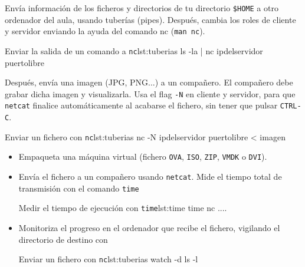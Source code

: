 \begin{homeworkProblem}
  Envía información de los ficheros y directorios de tu directorio \texttt{\$HOME} a otro ordenador del aula, usando tuberías (pipes). Después, cambia los roles de cliente y servidor enviando la ayuda del comando nc (\texttt{man nc}).



\begin{listadoshell}{Enviar la salida de un comando a \texttt{nc}}{lst:tuberias}
ls -la | nc ipdelservidor puertolibre
\end{listadoshell}

  Después, envía una imagen (JPG, PNG...) a un compañero. El compañero debe grabar dicha imagen y visualizarla. Usa el flag \texttt{-N} en cliente y servidor, para que \texttt{netcat} finalice automáticamente al acabarse el fichero, sin tener que pulsar \texttt{CTRL-C}.

\begin{listadoshell}{Enviar un fichero con \texttt{nc}}{lst:tuberias}
nc -N ipdelservidor puertolibre < imagen
\end{listadoshell}
\end{homeworkProblem}


\begin{homeworkProblem}
  \begin{itemize}
  \item Empaqueta una máquina virtual (fichero \texttt{OVA}, \texttt{ISO}, \texttt{ZIP}, \texttt{VMDK} o \texttt{DVI}).
  \item Envía el fichero a un compañero usando \texttt{netcat}. Mide el tiempo total de transmisión con el comando \texttt{time}

\begin{listadoshell}{Medir el tiempo de ejecución con  \texttt{time}}{lst:time}
time nc ....
\end{listadoshell}
    
  \item Monitoriza el progreso en el ordenador que recibe el fichero, vigilando el directorio de destino con

\begin{listadoshell}{Enviar un fichero con \texttt{nc}}{lst:tuberias}
watch -d ls -l
\end{listadoshell}

    
  \end{itemize}
\end{homeworkProblem}


